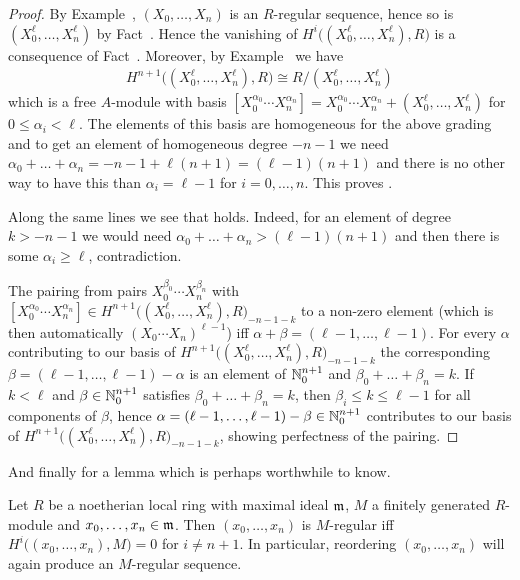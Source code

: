 \documentclass[a4paper,parskip=half,numbers=enddot, DIV=12]{scrreprt}
\renewcommand{\leq}{\leqslant}
\renewcommand{\geq}{\geqslant}
\begin{document}
\begin{proof}
	By Example~, $(X_0,\ldots,X_n)$ is an $R$-regular sequence, hence so is $(X_0^\ell,\ldots,X_n^\ell)$ by Fact~. Hence the vanishing of $H^i\big((X_0^\ell,\ldots,X_n^\ell),R\big)$ is a consequence of Fact~. Moreover, by Example~ we have 
	\begin{align*}
		H^{n+1}\big((X_0^\ell,\ldots,X_n^\ell),R\big)\cong R/(X_0^\ell,\ldots,X_n^\ell) 
	\end{align*}
	which is a free $A$-module with basis $[X_0^{\alpha_0}\cdots X_n^{\alpha_n}]=X_0^{\alpha_0}\cdots X_n^{\alpha_n}+(X_0^\ell,\ldots,X_n^\ell)$ for $0\leq\alpha_i<\ell$. The elements of this basis are homogeneous for the above grading and to get an element of homogeneous degree $-n-1$ we need $\alpha_0+\ldots+\alpha_n=-n-1+\ell(n+1)=(\ell-1)(n+1)$ and there is no other way to have this than $\alpha_i=\ell-1$ for $i=0,\ldots,n$. This proves .
	
	Along the same lines we see that  holds. Indeed, for an element of degree $k>-n-1$ we would need $\alpha_0+\ldots+\alpha_n>(\ell-1)(n+1)$ and then there is some $\alpha_i\geq \ell$, contradiction.
	
	The pairing from  pairs $X_0^{\beta_0}\cdots X_n^{\beta_n}$ with $[X_0^{\alpha_0}\cdots X_n^{\alpha_n}]\in H^{n+1}\big((X_0^\ell,\ldots,X_n^\ell),R\big)_{-n-1-k}$ to a non-zero element (which is then automatically $(X_0\cdots X_n)^{\ell-1}$) iff $\alpha+\beta=(\ell-1,\ldots,\ell-1)$. For every $\alpha$ contributing to our basis of $H^{n+1}\big((X_0^\ell,\ldots,X_n^\ell),R\big)_{-n-1-k}$ the corresponding $\beta=(\ell-1,\ldots,\ell-1)-\alpha$ is an element of $\mathbb{N}_0^{n+1}$ and $\beta_0+\ldots+\beta_n=k$. If $k<\ell$ and $\beta\in\mathbb{N}_0^{n+1}$ satisfies $\beta_0+\ldots+\beta_n=k$, then $\beta_i\leq k\leq\ell-1$ for all components of $\beta$, hence $\alpha=(\ell-1,\ldots,\ell-1)-\beta\in\mathbb{N}_0^{n+1}$ contributes to our basis of $H^{n+1}\big((X_0^\ell,\ldots,X_n^\ell),R\big)_{-n-1-k}$, showing perfectness of the pairing.
\end{proof}
And finally for a lemma which is perhaps worthwhile to know.
\begin{lem}
	Let $R$ be a noetherian local ring with maximal ideal $\mathfrak{m}$, $M$ a finitely generated $R$-module and $x_0,\ldots,x_n\in\mathfrak{m}$. Then $(x_0,\ldots,x_n)$ is $M$-regular iff $H^i\big((x_0,\ldots,x_n),M\big)=0$ for $i\neq n+1$. In particular, reordering $(x_0,\ldots,x_n)$ will again produce an $M$-regular sequence.
\end{lem}
\end{document}
